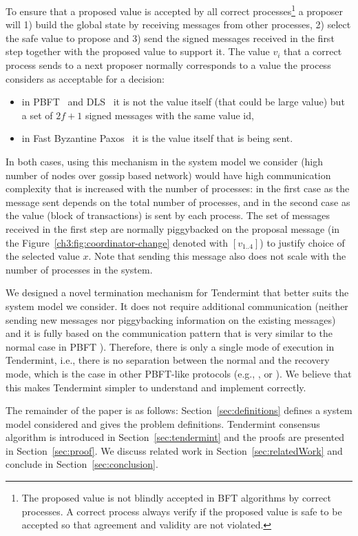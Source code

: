 To ensure that a proposed value is accepted by all correct processes\footnote{The proposed value is not blindly accepted in BFT algorithms by correct processes. A correct process always verify if the proposed value is safe to be accepted so that agreement and validity are not violated.} a proposer will 1) build the global state by receiving messages from other processes, 2) select the safe value to propose and 3) send the signed messages received in the first step together with the proposed value to support it. The value $v_i$ that a correct process sends to a next proposer normally corresponds to a value the process considers as acceptable for a decision: 

\begin{itemize}
	\item in PBFT~\cite{CL99:osdi} and DLS~\cite{DLS88:jacm} it is not the value itself (that could be large value) but a set of $2f+1$ signed messages with the same value id,
	\item in Fast Byzantine Paxos~\cite{MA06:tdsc} it is the value itself that is being sent.  
\end{itemize}

In both cases, using this mechanism in the system model we consider (high number of nodes over gossip based network) would have high communication complexity that is increased with the number of processes: in the first case as the message sent depends on the total number of processes, and in the second case as the value (block of transactions) is sent by each process. The set of messages received in the first step are normally piggybacked on the proposal message (in the Figure~\ref{ch3:fig:coordinator-change} denoted with $[v_{1..4}]$) to justify choice of the selected value $x$. Note that sending this message also does not scale with the number of processes in the system.   

We designed a novel termination mechanism for Tendermint that better suits the system model we consider. It does not require additional communication (neither sending new messages nor piggybacking information on the existing messages) and it is
fully based on the communication pattern that is very similar to the normal case in PBFT \cite{CL99:osdi}). Therefore, there is only a single mode of execution in Tendermint, i.e., there is no separation between the normal and the recovery mode, which is the case in other PBFT-like protocols (e.g., \cite{CL99:osdi}, \cite{Ver09:spinning} or \cite{Cle09:aardvark}). We believe that this makes Tendermint simpler to understand and implement correctly.  

The remainder of the paper is as follows: Section~\ref{sec:definitions} defines a system model considered and gives the problem definitions. Tendermint consensus algorithm 
is introduced in Section~\ref{sec:tendermint} and the proofs are presented in Section~\ref{sec:proof}. We discuss related work in Section~\ref{sec:relatedWork} and conclude in Section~\ref{sec:conclusion}.  

